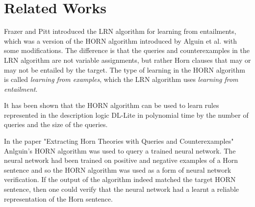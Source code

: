 \chapter{Related Works}

Frazer and Pitt introduced the LRN algorithm for learning from entailments, \cite{DBLP:conf/icml/FrazierP93} which was a version of the HORN algorithm introduced by Alguin et al. \cite{DBLP:journals/ml/AngluinFP92} with some modifications. The difference is that the queries and counterexamples in the LRN algorithm are not variable assignments, but rather Horn clauses that may or may not be entailed by the target. The type of learning in the HORN algorithm is called \emph{learning from examples}, which the LRN algorithm uses \emph{learning from entailment}.

It has been shown that the HORN algorithm can be used to learn rules represented in the description logic DL-Lite in polynomial time by the number of queries and the size of the queries. \cite{DL_lite} 

In the paper "Extracting Horn Theories with Queries and Counterexamples"  Anlguin's HORN algorithm was used to query a trained neural network. The neural network had been trained on positive and negative examples of a Horn sentence and so the HORN algorithm was used as a form of neural network verification. If the output of the algorithm indeed matched the target HORN sentence, then one could verify that the neural network had a learnt a reliable representation of the Horn sentence.
